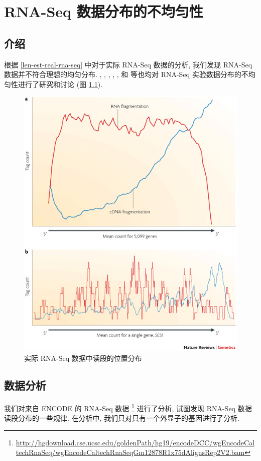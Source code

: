 \chapter{RNA-Seq 数据分布的不均匀性}
\label{chap-rna-seq-nonunif}

\section{介绍}
根据 \ref{len-est-real-rna-seq} 中对于实际 RNA-Seq 数据的分析, 
我们发现 RNA-Seq 数据并不符合理想的均匀分布. 
, , 
, , , 和
 等也均对 RNA-Seq 实验数据分布的不均匀性进行了研究和讨论
 (图 \ref{rna-seq-bias}). 

\begin{figure}[!t]
\centering
\includegraphics[width=\textwidth]{figures/nonunif/rna-seq-bias.jpg}
\caption{实际 RNA-Seq 数据中读段的位置分布 \cite{wang2009rna}}
\label{rna-seq-bias}
\end{figure}

\section{数据分析}
我们对来自 ENCODE \cite{encode} 的 RNA-Seq 数据 
\footnote{\url{http://hgdownload.cse.ucsc.edu/goldenPath/hg19/encodeDCC/wgEncodeCaltechRnaSeq/wgEncodeCaltechRnaSeqGm12878R1x75dAlignsRep2V2.bam}} 
进行了分析, 试图发现 RNA-Seq 数据读段分布的一些规律. 
在分析中, 我们只对只有一个外显子的基因进行了分析.

